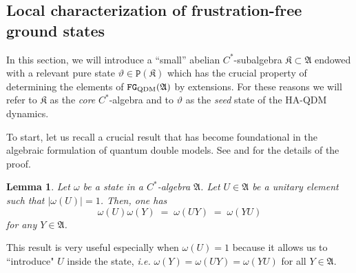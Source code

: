 \documentclass[a4paper,12pt,twoside,reqno]{amsart}
\theoremstyle{plain}
\newtheorem{lemma}[teo]{Lemma}
\theoremstyle{definition}
\theoremstyle{remark}
\numberwithin{equation}{section}
\numberwithin{figure}{section}
\numberwithin{table}{section}
\begin{document}
	
	
	
	
	
	
	\subsection{Local characterization of frustration-free ground states}
	In this section, we will introduce a ``small'' abelian $C^*$-subalgebra
	$\mathfrak{K}\subset \mathfrak{A}$ endowed with a relevant pure state $\vartheta\in \mathtt{P}(\mathfrak{K})$ which has the crucial property of determining the elements of $\mathtt{FG}_{\rm QDM}(\mathfrak{A})$ by extensions. For these reasons we will refer to $\mathfrak{K}$ as the \emph{core} $C^*$-algebra and to $\vartheta$ as the \emph{seed} state of the
	{HA-QDM dynamics}. 
	
	
	
	
	\medskip
	
	
	
	
	
	
	To start, let us recall a crucial result that has become foundational in the algebraic formulation of quantum double models. See \cite[Section 2.1.1]{Fannes} and \cite[Lemma 6.1]{Vrana} for the details of the proof.
	
	
	
	
	
	\begin{lemma}\label{lema estado}
		Let $\omega$ be a state in a $C^*$-algebra $\mathfrak{A}$. Let $U\in\mathfrak{A}$ be a unitary element such that $|\omega(U)|=1$. Then,  one has
		\begin{equation*}
			\omega(U)\omega(Y)\;=\;\omega(UY)\;=\;\omega(YU)
		\end{equation*}
		for any $Y\in\mathfrak{A}$.
	\end{lemma}
	
	
	
	
	
	
	\medskip
	
	
	
	
	
	
	
	This result is very useful  especially when $\omega(U)=1$ because it  allows us to ``introduce" $U$ inside the state, \emph{i.e.} $\omega(Y)=\omega(UY)=\omega(YU)$ for all $Y\in\mathfrak{A}$.
	
	
	
	
	
	
	
\end{document}
